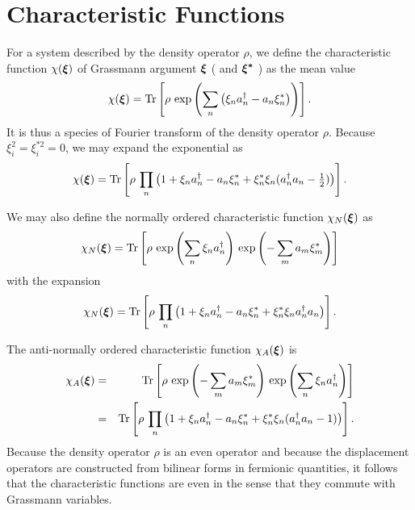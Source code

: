 \documentclass[12pt]{article}
\def\beq{\begin{equation}}
\def\eeq{\end{equation}}
\def\bea{\begin{eqnarray}}
\def\eea{\end{eqnarray}}
\def\x{\xi}
\def\bx{{\mbox{\boldmath$\xi$}}}
\def\bxs{{\mbox{\boldmath$\xi^*$}}}
\def\xs{\xi^*}
\def\dgr{\dagger}
\def\Tr{{\rm Tr}}
\def\thalf{\textstyle{ {1 \over 2} } }
\def\G{Grassmann }
\def\op{operator }
\def\ops{operators }
\begin{document}
\section{Characteristic Functions}
For a system described by the density operator $ \rho $,
we define the characteristic function $ \chi ( \bx ) $
of Grassmann argument $ \bx $ ( and $ \bxs $ )
as the mean value 
\beq
\chi ( \bx ) = \Tr \left[ 
\rho \, \exp \left( \sum_n \left( \x_n a^\dgr_n - a_n \xs_n \right) \right)
\right] .
\label {char}
\eeq 
It is thus a species of Fourier transform
of the density \op $ \rho $.
Because $ \x_i^2 = \xi_i^{*2} = 0 $,
we may expand the exponential as
\beq
\chi ( \bx ) = \Tr \left[
\rho \, \prod_n \left(
1 + \x_n a^\dgr_n - a_n \xs_n 
+ \xs_n \x_n ( a^\dgr_n a_n - \thalf )
\right)
\right] .
\label {charp}
\eeq
\par
We may also define the normally ordered
characteristic function $ \chi_N ( \bx ) $ as
\beq
\chi_N ( \bx ) = \Tr \left[
\rho \, \exp\left( \sum_n \x_n a^\dgr_n \right)
\, \exp \left( - \sum_m a_m \xs_m \right)
\right] 
\label {charn}
\eeq
with the expansion
\beq
\chi_N ( \bx ) = \Tr \left[
\rho \, \prod_n \left(
1 + \x_n a^\dgr_n - a_n \xs_n
+ \xs_n \x_n a^\dgr_n a_n 
\right)
\right] .
\label {charnp}
\eeq
\par
The anti-normally ordered
characteristic function $ \chi_A ( \bx ) $ is 
\bea
\chi_A ( \bx ) & = & \Tr \left[
\rho 
\, \exp\left( - \sum_m a_m \xs_m \right)
\, \exp\left( \sum_n \x_n a^\dgr_n \right)
\right] \label {charA}\\
& = &
\Tr \left[
\rho \, \prod_n \left(
1 + \x_n a^\dgr_n - a_n \xs_n
+ \xs_n \x_n ( a^\dgr_n a_n - 1 )
\right)
\right] .
\label {chara}
\eea
Because the density \op $ \rho $ 
is an even \op and because
the displacement \ops are constructed
from bilinear forms in fermionic quantities, 
it follows that the characteristic functions
are even in the sense that they commute
with \G variables.
\end{document}
